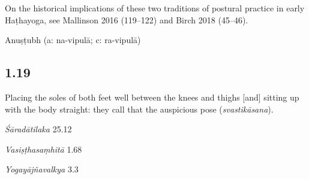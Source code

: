 \begin{ekdosis}
\begin{testimonia}[hp01_018]
\end{testimonia}

\begin{philcomm}[hp01_018]        
On the historical implications of these two traditions of postural practice in early Haṭhayoga, see Mallinson 2016 (119–122) and Birch 2018 (45–46).
\end{philcomm}

\begin{metre}[hp01_018]
Anuṣṭubh (a: na-vipulā; c: ra-vipulā)
\end{metre}

\subsection*{1.19}
\begin{translation}[hp01_019]
Placing the soles of both feet well between the knees and thighs [and] sitting up with the body straight: they call that the auspicious pose (\emph{svastikāsana}).%
\end{translation}

\begin{sources}[hp01_019]
\emph{Śāradātilaka} 25.12

\begin{versinnote}
\end{versinnote}

\emph{Vasiṣṭhasaṃhitā} 1.68

\begin{versinnote}
\end{versinnote}

\emph{Yogayājñavalkya} 3.3

\begin{versinnote}
\end{versinnote}


\end{sources}
\end{ekdosis}
